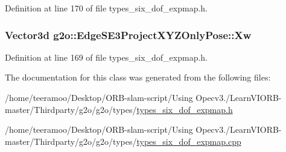 Definition at line 170 of file types\+\_\+six\+\_\+dof\+\_\+expmap.\+h.

\subsubsection[{\texorpdfstring{Xw}{Xw}}]{\setlength{\rightskip}{0pt plus 5cm}Vector3d g2o\+::\+Edge\+S\+E3\+Project\+X\+Y\+Z\+Only\+Pose\+::\+Xw}\hypertarget{classg2o_1_1EdgeSE3ProjectXYZOnlyPose_a66318605e8e9c2276b100cf73e718ea8}{}\label{classg2o_1_1EdgeSE3ProjectXYZOnlyPose_a66318605e8e9c2276b100cf73e718ea8}


Definition at line 169 of file types\+\_\+six\+\_\+dof\+\_\+expmap.\+h.



The documentation for this class was generated from the following files\+:\begin{DoxyCompactItemize}
\item 
/home/teeramoo/\+Desktop/\+O\+R\+B-\/slam-\/script/\+Using Opecv3./\+Learn\+V\+I\+O\+R\+B-\/master/\+Thirdparty/g2o/g2o/types/\hyperlink{types__six__dof__expmap_8h}{types\+\_\+six\+\_\+dof\+\_\+expmap.\+h}\item 
/home/teeramoo/\+Desktop/\+O\+R\+B-\/slam-\/script/\+Using Opecv3./\+Learn\+V\+I\+O\+R\+B-\/master/\+Thirdparty/g2o/g2o/types/\hyperlink{types__six__dof__expmap_8cpp}{types\+\_\+six\+\_\+dof\+\_\+expmap.\+cpp}\end{DoxyCompactItemize}
